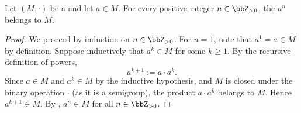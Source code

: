 \begin{lemma}
\label{lemma:power_of_semigroup_element_is_in_semigroup}
Let $(M,\cdot)$ be a  and let $a \in M$. For every positive integer $n \in \bbZ_{>0}$, the  $a^n$ belongs to $M$.
\end{lemma}

\begin{proof}
We proceed by induction on $n \in \bbZ_{>0}$. For $n =1$, note that $a^1 = a \in M$ by definition. Suppose inductively that $a^k \in M$ for some $k \ge 1$. By the recursive definition of powers,
$$ a^{k+1} := a \cdot a^k. $$
Since $a \in M$ and $a^k \in M$ by the inductive hypothesis, and $M$ is closed under the binary operation $\cdot$ (as it is a semigroup), the product $a \cdot a^k$ belongs to $M$. Hence $a^{k+1} \in M$. By , $a^n \in M$ for all $n \in \bbZ_{>0}$.
\end{proof}